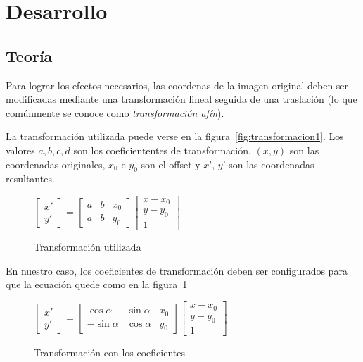 \section{Desarrollo}
\subsection{Teoría}
Para lograr los efectos necesarios, las coordenas de la imagen original deben ser modificadas mediante una transformación lineal seguida de una traslación (lo que comúnmente se conoce como \textit{transformación afín}).

\par La transformación utilizada puede verse en la figura~\ref{fig:transformacion1}. Los valores $a, b, c, d$ son los coeficiententes de transformación, $(x ,y)$ son las coordenadas originales, $x_{0}$ e $y_{0}$ son el offset y $x$', $y$' son las coordenadas resultantes.     

\begin{figure}[h!]
 \caption{Transformación utilizada}
 \centering
   $
   \begin{bmatrix}
x'\\y' 

\end{bmatrix}
=
\begin{bmatrix}
 a & b  & x_{0} \\ 
 a & b  & y_{0} 
\end{bmatrix}
\begin{bmatrix}
x - x_{0}\\ 
y - y_{0}\\
1 
\end{bmatrix}
   $
\end{figure}

En nuestro caso, los coeficientes de transformación deben ser configurados para que la ecuación quede como en la figura~\ref{fig:transformacion2} 

\begin{figure}[h!]
 \caption{Transformación con los coeficientes}
 \centering
 $
 \begin{bmatrix}
x'\\y' 

\end{bmatrix}
=
   \begin{bmatrix}
 \cos \alpha & \sin\alpha  & x_{0} \\ 
 -\sin \alpha & \cos\alpha  & y_{0} 
\end{bmatrix}
\begin{bmatrix}
x - x_{0}\\ 
y - y_{0}\\
1 
\end{bmatrix}
$
   \label{fig:transformacion2}
\end{figure}

